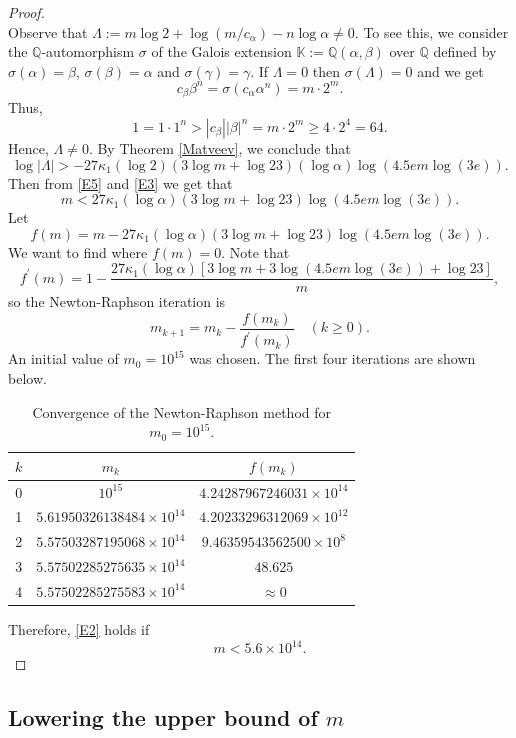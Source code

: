 \documentclass[11pt,a4paper]{article}
\numberwithin{equation}{section}
\numberwithin{table}{section}
\numberwithin{figure}{section}
\begin{document}
\begin{proof}
$$$$
Observe that $\Lambda :=m\log 2+\log (m/c_{\alpha})-n\log \alpha \neq 0$. To see this, we consider the $\mathbb{Q}$-automorphism $\sigma$ of the Galois extension $\mathbb{K}:=\mathbb{Q}(\alpha,\beta)$ over $\mathbb{Q}$ defined by $\sigma(\alpha)=\beta$, $\sigma(\beta)=\alpha$ and $\sigma(\gamma)=\gamma$. If $\Lambda =0$ then $\sigma(\Lambda)=0$ and we get
$$
c_{\beta}\beta^{n}=\sigma(c_{\alpha} \alpha^{n})=m\cdot 2^{m}.
$$
Thus,
$$
1=1\cdot 1^{n}>|c_{\beta}||\beta|^{n}=m\cdot 2^{m}\ge 4\cdot 2^{4}=64.
$$
Hence, $\Lambda \neq 0$. By Theorem \ref{Matveev}, we conclude that
\begin{equation}\label{E3}
\log |\Lambda|>-27\kappa_{1}(\log 2)(3\log m+\log 23)(\log \alpha)\log (4.5em\log (3e)).
\end{equation}
Then from \eqref{E5} and \eqref{E3} we get that
\begin{equation}\label{E2}
m<27\kappa_{1}(\log \alpha)(3\log m+\log 23)\log (4.5em\log (3e)).
\end{equation}
Let
$$
f(m)=m-27\kappa_{1}(\log \alpha)(3\log m+\log 23)\log (4.5em\log (3e)).
$$
We want to find where $f(m)=0$. Note that
$$
f^{\prime}(m)=1-\frac{27\kappa_{1}(\log \alpha) [3\log m+3\log (4.5em\log (3e)) + \log 23]}{m},
$$
so the Newton-Raphson iteration is 
$$
m_{k+1}=m_{k}-\frac{f(m_{k})}{f^{\prime}(m_{k})}\quad (k\ge 0).
$$
An initial value of $m_{0}=10^{15}$ was chosen. The first four iterations are shown below.
\begin{table}[H]
\centering
\begin{tabular}{|c|c|c|}
\hline
$k$ & $m_{k}$ & $f(m_k)$ \\ \hline
0 & $10^{15}$ & $4.24287967246031 \times 10^{14}$ \\ \hline
1 & $5.61950326138484 \times 10^{14}$ & $4.20233296312069 \times 10^{12}$ \\ \hline
2 & $5.57503287195068 \times 10^{14}$ & $9.46359543562500 \times 10^{8}$ \\ \hline
3 & $5.57502285275635 \times 10^{14}$ & $48.625$ \\ \hline
4 & $5.57502285275583 \times 10^{14}$ & $\approx 0$ \\ \hline
\end{tabular}
\caption{Convergence of the Newton-Raphson method for $m_{0}=10^{15}$.}
\end{table}
Therefore, \eqref{E2} holds if 
$$
m<5.6\times 10^{14}.
$$
\end{proof}

\subsection{Lowering the upper bound of $m$}
\end{document}

